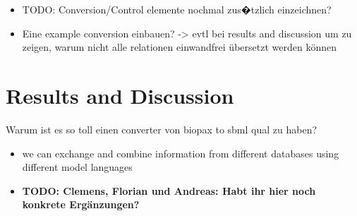 \documentclass{bioinfo}
\begin{document}
\begin{methods}
%
%


\begin{itemize}
\item TODO: Conversion/Control elemente nochmal zus�tzlich einzeichnen?
\item Eine example conversion einbauen? -> evtl bei results and discussion um zu zeigen, warum nicht alle relationen einwandfrei \"ubersetzt werden k\"onnen
\end{itemize}
\end{methods}


\section{Results and Discussion}
Warum ist es so toll einen converter von biopax to sbml qual zu haben?
\begin{itemize}
\item we can exchange and combine information from different databases using different model languages
\item \textbf{TODO: Clemens, Florian und Andreas: Habt ihr hier noch konkrete Erg\"anzungen?}
\end{itemize}
\end{document}
